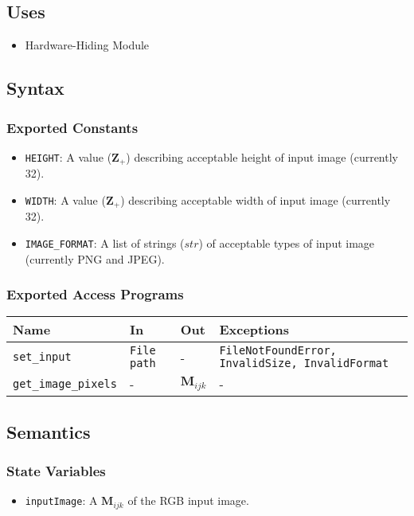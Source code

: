 \documentclass[12pt, titlepage]{article}
\def\code#1{\texttt{#1}}
\begin{document}
\subsection{Uses}
\begin{itemize}
  \item Hardware-Hiding Module  
\end{itemize}


\subsection{Syntax}

\subsubsection{Exported Constants}
\begin{itemize}
  \item \code{HEIGHT}: A value ($\mathbf{Z}_{+}$) describing acceptable height of input image 
  (currently 32).
  \item \code{WIDTH}: A value ($\mathbf{Z}_{+}$) describing acceptable width of input image
  (currently 32).
  \item \code{IMAGE\_FORMAT}: A list of strings ($str$) of acceptable types of input image 
  (currently PNG and JPEG).
\end{itemize}

\subsubsection{Exported Access Programs}

\begin{center}
\begin{tabular}{p{3.5cm} p{4cm} p{4cm} p{4cm}}
\hline
\textbf{Name} & \textbf{In} & \textbf{Out} & \textbf{Exceptions} \\
\hline
\code{set\_input} & \code{File path} & - & \code{FileNotFoundError, InvalidSize, InvalidFormat} \\
\code{get\_image\_pixels} & - & $\mathbf{M}_{ijk}$ & - \\
\hline
\end{tabular}
\end{center}

\subsection{Semantics}

\subsubsection{State Variables}
\begin{itemize}
  \item \code{inputImage}: A $\mathbf{M}_{ijk}$ of the RGB input image.
\end{itemize}
\end{document}
